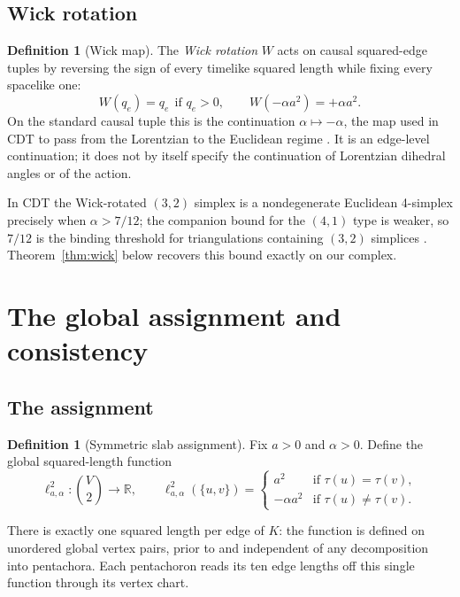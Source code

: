 \documentclass[11pt]{article}
\theoremstyle{definition}
\newtheorem{definition}[theorem]{Definition}
\theoremstyle{remark}
\newcommand{\R}{\mathbb{R}}
\newcommand{\Kmin}{K}
\newcommand{\ltwo}{\ell^{2}_{a,\alpha}}
\newcommand{\Wick}{W}
\begin{document}
\subsection{Wick rotation}

\begin{definition}[Wick map]
\label{def:wick}
The \emph{Wick rotation} $\Wick$ acts on causal squared-edge tuples by reversing the sign of every timelike squared length while fixing every spacelike one:
\[
\Wick(q_{e})=q_{e}\ \ \text{if } q_{e}>0,
\qquad
\Wick(-\alpha a^{2})=+\alpha a^{2}.
\]
On the standard causal tuple this is the continuation $\alpha\mapsto-\alpha$, the map used in CDT to pass from the Lorentzian to the Euclidean regime \cite{AJL,Loll}. It is an edge-level continuation; it does not by itself specify the continuation of Lorentzian dihedral angles or of the action.
\end{definition}

In CDT the Wick-rotated $(3,2)$ simplex is a nondegenerate Euclidean 4-simplex precisely when $\alpha>7/12$; the companion bound for the $(4,1)$ type is weaker, so $7/12$ is the binding threshold for triangulations containing $(3,2)$ simplices \cite{AJL}. Theorem~\ref{thm:wick} below recovers this bound exactly on our complex.

\section{The global assignment and consistency}
\label{sec:assignment}

\subsection{The assignment}

\begin{definition}[Symmetric slab assignment]
\label{def:assignment}
Fix $a>0$ and $\alpha>0$. Define the global squared-length function
\[
\ltwo:\binom{V}{2}\to\R,
\qquad
\ltwo(\{u,v\})=
\begin{cases}
a^{2} & \text{if } \tau(u)=\tau(v),\\[2pt]
-\alpha a^{2} & \text{if } \tau(u)\neq\tau(v).
\end{cases}
\]
\end{definition}

There is exactly one squared length per edge of $\Kmin$: the function is defined on unordered global vertex pairs, prior to and independent of any decomposition into pentachora. Each pentachoron reads its ten edge lengths off this single function through its vertex chart.
\end{document}
